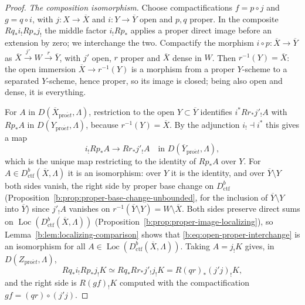 \documentclass[11pt,a4paper]{article}
\numberwithin{equation}{section}
\theoremstyle{definition}
\theoremstyle{remark}
\newcommand{\Loc}{\operatorname{Loc}}
\newcommand{\proet}{\mathrm{pro}\acute{e}t}
\newcommand{\Dctf}{D^b_{\mathrm{ctf}}}
\begin{document}
\begin{proof}
\emph{The composition isomorphism.} Choose compactifications $f=p\circ j$
and $g=q\circ i$, with $j:X\to\overline X$ and $i:Y\to\overline Y$ open and
$p,q$ proper. In the composite $Rq_*i_!Rp_*j_!$ the middle factor $i_!Rp_*$
applies a proper direct image before an extension by zero; we
interchange the two.
Compactify the morphism $i\circ p:\overline X\to\overline Y$ as
$\overline X\xrightarrow{j'}W\xrightarrow{r}\overline Y$, with $j'$ open,
$r$ proper and $\overline X$ dense in $W$. Then $r^{-1}(Y)=\overline X$:
the open immersion $\overline X\to r^{-1}(Y)$ is a morphism from a proper
$Y$-scheme to a separated $Y$-scheme, hence proper, so its image is closed;
being also open and dense, it is everything.

For $A$ in $D(\overline X_{\proet},\Lambda)$, restriction to the open
$Y\subset\overline Y$ identifies $i^*Rr_*j'_!A$ with $Rp_*A$ in
$D(Y_{\proet},\Lambda)$, because
$r^{-1}(Y)=\overline X$. By the adjunction $i_!\dashv i^*$ this gives a map
\begin{equation}
 i_!Rp_*A\longrightarrow Rr_*j'_!A\quad\text{in }D(\overline Y_{\proet},\Lambda),
 \label{b:eq:open-proper-interchange}
\end{equation}
which is the unique map restricting to the identity of $Rp_*A$ over $Y$.
For $A\in\Dctf(\overline X,\Lambda)$ it is an isomorphism: over $Y$ it is
the identity, and over $\overline Y\setminus Y$ both sides vanish, the
right side by proper base change on $\Dctf$
(Proposition~\ref{b:prop:proper-base-change-unbounded}, for the inclusion
of $\overline Y\setminus Y$ into $\overline Y$) since $j'_!A$ vanishes on
$r^{-1}(\overline Y\setminus Y)=W\setminus\overline X$. Both sides preserve
direct sums on $\Loc(\Dctf(\overline X,\Lambda))$
(Proposition~\ref{b:prop:proper-image-localizing}), so
Lemma~\ref{b:lem:localizing-comparison} shows that
\eqref{b:eq:open-proper-interchange} is an isomorphism for all
$A\in\Loc(\Dctf(\overline X,\Lambda))$. Taking $A=j_!K$ gives, in $D(Z_{\proet},\Lambda)$,
\[
 Rq_*i_!Rp_*j_!K\simeq Rq_*Rr_*j'_!j_!K=R(qr)_*(j'j)_!K,
\]
and the right side is $R(gf)_!K$ computed with the compactification
$gf=(qr)\circ(j'j)$.


\end{proof}
\end{document}
